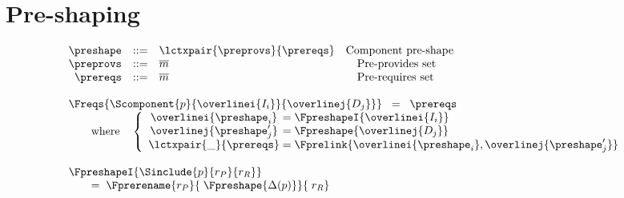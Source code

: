 \section{Pre-shaping}


\begin{figure}
\[
\begin{array}{@{}l}
  \begin{array}{rcll}
    \preshape   &::=& \lctxpair{\preprovs}{\prereqs}
      & \mbox{Component pre-shape} \\
    \preprovs  &::=& \overline{m}
      & \quad\mbox{Pre-provides set} \\
    \prereqs   &::=& \overline{m}
      & \quad\mbox{Pre-requires set} \\
  \end{array} \\
  \\
  

  \begin{array}{l}
    \Freqs{\Scomponent{p}{\overlinei{I_i}}{\overlinej{D_j}}} \;\;=\;\; \prereqs \\
    \qquad\text{where}\quad
      \left\{\begin{array}{c@{\;=\;}l}
        \overlinei{\preshape_i}  & \FpreshapeI{\overlinei{I_i}} \\
        \overlinej{\preshape'_j} & \Fpreshape{\overlinej{D_j}} \\
        \lctxpair{\_}{\prereqs}  & \Fprelink{\overlinei{\preshape_i}, \overlinej{\preshape'_j}} \\
      \end{array}\right. \\
  \end{array} \\
  \\

  \begin{array}{l}
    \FpreshapeI{\Sinclude{p}{r_P}{r_R}} \\%
    \qquad =\; \Fprerename{r_P}{\;\Fpreshape{\Delta(p)}}{\;r_R} \\
  \end{array} \\
  \\


\end{array}\]
\end{figure}
